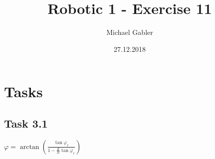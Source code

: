 \documentclass{article}
\begin{document}
	\author{Michael Gabler}
	\title{Robotic 1 - Exercise 11}
	\date{27.12.2018}
	\maketitle
	
	\newpage
	
	\tableofcontents
	
	\newpage
	
	\section{Tasks}
	\subsection{Task 3.1}
	$\varphi = \arctan(\frac{\tan \varphi_{r}}{1-\frac{d}{2l}\tan \varphi_{r}})$
\end{document}
